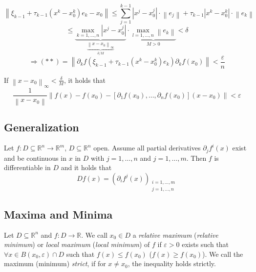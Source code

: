 \documentclass[a4paper,landscape,twocolumn]{article}
\theoremstyle{definition}
\newcommand\abs[1]{\left|#1\right|}
\newcommand\norm[1]{\left\|#1\right\|}
\newcommand\inorm[1]{\left\|#1\right\|_\infty}
\begin{document}
\[ \norm{\xi_{k-1} + \tau_{k-1} (x^k - x_0^k) e_k - x_0} \leq \sum_{j=1}^{k-1} \abs{x^j - x_0^j} \cdot \norm{e_j} + \tau_{k-1} \abs{x^k - x_0^k} \cdot \norm{e_k} \]
\[ \leq \underbrace{\max_{k=1,\ldots,n} \abs{x^j - x_0^j}}_{\underbrace{\inorm{x - x_0}}_{\delta / M}} \cdot \underbrace{\max_{l=1,\ldots,n} \norm{e_k}}_{M>0} < \delta \]
\[ \Rightarrow (**) = \norm{\partial_k f(\xi_{k-1} + \tau_{k-1}(x^k - x_0^k) e_k) \partial_k f(x_0)} < \frac\varepsilon{n} \]

If $\inorm{x - x_0} < \frac\delta{M}$, it holds that
\[ \frac{1}{\norm{x - x_0}} \norm{f(x) - f(x_0) - [\partial_1 f(x_0), \ldots, \partial_n f(x_0)](x - x_0)} < \varepsilon \]

\subsection{Generalization}

Let $f: D \subseteq \mathbb R^n \to \mathbb R^m$, $D \subseteq \mathbb R^n$ open.
Assume all partial derivatives $\partial_j f^i(x)$ exist and be continuous in $x$ in $D$ with $j = 1, \ldots, n$ and $j = 1, \ldots, m$. Then $f$ is differentiable in $D$ and it holds that
\[ Df(x) = \left(\partial_i f^j(x)\right)_{\substack{i=1,\ldots,m \\ j = 1,\ldots,n}} \]

\subsection{Maxima and Minima}
%
Let $D \subseteq \mathbb R^n$ and $f: D \to \mathbb R$. We call $x_0 \in D$
a \emph{relative maximum} (\emph{relative minimum}) or \emph{local maximum} (\emph{local minimum}) of $f$ if $\varepsilon > 0$ exists such that $\forall x \in B(x_0, \varepsilon) \cap D$ such that $f(x) \leq f(x_0)$ ($f(x) \geq f(x_0)$).
We call the maximum (minimum) \emph{strict}, if for $x \neq x_0$, the inequality holds strictly.
\end{document}
